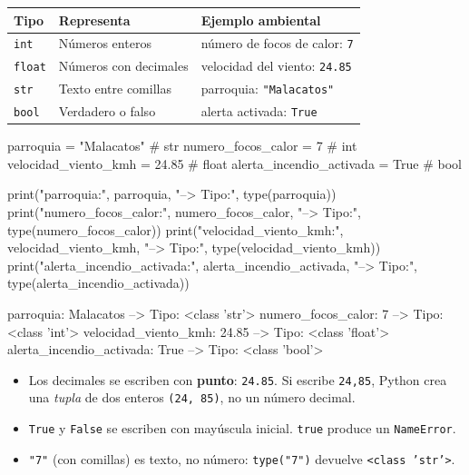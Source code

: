 \documentclass[11pt,a4paper]{article}
\newcommand{\code}[1]{\texttt{#1}}
\begin{document}
\begin{center}
\renewcommand{\arraystretch}{1.25}
\begin{tabular}{l l l}
\toprule
\textbf{Tipo} & \textbf{Representa} & \textbf{Ejemplo ambiental} \\
\midrule
\code{int} & Números enteros & número de focos de calor: \code{7} \\
\code{float} & Números con decimales & velocidad del viento: \code{24.85} \\
\code{str} & Texto entre comillas & parroquia: \code{"Malacatos"} \\
\code{bool} & Verdadero o falso & alerta activada: \code{True} \\
\bottomrule
\end{tabular}
\end{center}

\begin{codigo}
parroquia = "Malacatos"                # str
numero_focos_calor = 7                 # int
velocidad_viento_kmh = 24.85           # float
alerta_incendio_activada = True        # bool

print("parroquia:", parroquia, "--> Tipo:", type(parroquia))
print("numero_focos_calor:", numero_focos_calor, "--> Tipo:", type(numero_focos_calor))
print("velocidad_viento_kmh:", velocidad_viento_kmh, "--> Tipo:", type(velocidad_viento_kmh))
print("alerta_incendio_activada:", alerta_incendio_activada, "--> Tipo:", type(alerta_incendio_activada))
\end{codigo}
\begin{salida}
parroquia: Malacatos --> Tipo: <class 'str'>
numero_focos_calor: 7 --> Tipo: <class 'int'>
velocidad_viento_kmh: 24.85 --> Tipo: <class 'float'>
alerta_incendio_activada: True --> Tipo: <class 'bool'>
\end{salida}

\begin{warn}
\begin{itemize}[nosep]
  \item Los decimales se escriben con \textbf{punto}: \code{24.85}. Si escribe \code{24,85}, Python crea una \emph{tupla} de dos enteros \code{(24, 85)}, no un número decimal.
  \item \code{True} y \code{False} se escriben con mayúscula inicial. \code{true} produce un \code{NameError}.
  \item \code{"7"} (con comillas) es texto, no número: \code{type("7")} devuelve \code{<class 'str'>}.
\end{itemize}
\end{warn}
\end{document}
